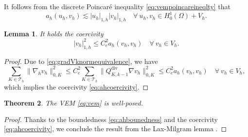 \documentclass[10pt]{amsart}
\newtheorem{theorem}{Theorem}[section]
\newtheorem{lemma}[theorem]{Lemma}
\renewcommand{\div}{\operatorname{div}}
\numberwithin{equation}{section}
\begin{document}
It follows from the discrete Poincar\'e inequality \eqref{eq:vempoincareineqlty} that 
\begin{equation}\label{eq:ahbounedness}
a_h(u_h, v_h)\lesssim |u_h|_{1,h}|v_h|_{1,h}\quad\forall~u_h,v_h\in H_0^1(\Omega)+V_h.
\end{equation}  
\begin{lemma}
It holds the coercivity
\begin{equation}\label{eq:ahcoercivity}
|v_h|_{1,h}^2\leq C_e^2 a_h(v_h, v_h)\quad\forall~v_h\in V_h.
\end{equation}  
\end{lemma}
\begin{proof}
Due to \eqref{eq:gradVknormequivalence}, we have
\[
\sum_{K\in\mathcal T_h}\|\nabla_h v_h\|_{0,K}^2\leq C_e^2 \sum_{K\in\mathcal T_h}\|Q_{K,k-1}^{\div}\nabla v_h\|_{0,K}^2\leq C_e^2a_h(v_h, v_h)\quad\forall~v_h\in V_h,
\]
which implies the coercivity \eqref{eq:ahcoercivity}.
\end{proof}

\begin{theorem}
The VEM \eqref{eq:vem} is well-posed.
\end{theorem}
\begin{proof}
Thanks to the boundedness \eqref{eq:ahbounedness} and the coercivity \eqref{eq:ahcoercivity}, we conclude the result from the Lax-Milgram lemma \cite{LaxMilgram1954}.
\end{proof}
\end{document}
